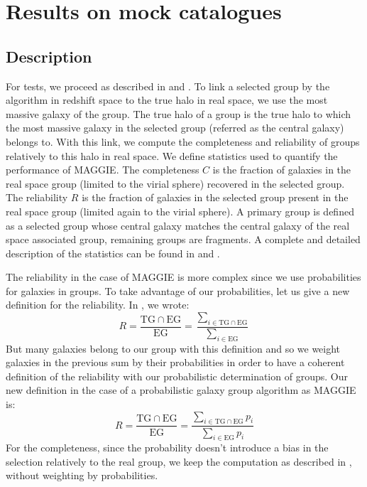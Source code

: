 \section{Results on mock catalogues}
\label{sec:results_on_mock_catalogue}

\subsection{Description}
\label{sub:maggie_tests_description}

For tests, we proceed as described in \citet{Yang+07, Duarte+14} and
. To link a selected group by the
algorithm in redshift space to the true halo in real space, we use the most
massive galaxy of the group. The true halo of a group is the true halo to which
the most massive galaxy in the selected group (referred as the central galaxy)
belongs to. With this link, we compute the completeness and reliability of
groups relatively to this halo in real space. We define statistics used to
quantify the performance of MAGGIE\@. The completeness $C$ is the fraction of
galaxies in the real space group (limited to the virial sphere) recovered in
the selected group. The reliability $R$ is the fraction of galaxies in the
selected group present in the real space group (limited again to the virial
sphere). A primary group is defined as a selected group whose central galaxy
matches the central galaxy of the real space associated group, remaining groups
are fragments. A complete and detailed description of the statistics can be
found in \citet{Duarte+14} and .

The reliability in the case of MAGGIE is more complex since we use
probabilities for galaxies in groups. To take advantage of our probabilities,
let us give a new definition for the reliability. In \citet{Duarte+14}, we
wrote:
%
\begin{equation}
    R=\frac{\mathrm{TG} \cap \mathrm{EG}}{\mathrm{EG}}=
    \frac{\sum_{i\in \mathrm{TG}\cap \mathrm{EG}}}{\sum_{i\in \mathrm{EG}}}
\end{equation}
%
But many galaxies belong to our group with this definition and so we
weight galaxies in the previous sum by their probabilities in order to have
a coherent definition of the reliability with our probabilistic
determination of groups. Our new definition in the case of a probabilistic
galaxy group algorithm as MAGGIE is:
%
\begin{equation}
    R=\frac{\mathrm{TG} \cap \mathrm{EG}}{\mathrm{EG}}=
    \frac{\sum_{i\in \mathrm{TG}\cap \mathrm{EG}} p_i}
    {\sum_{i\in \mathrm{EG}}p_i}
\end{equation}
%
For the completeness, since the probability doesn't introduce a bias in the
selection relatively to the real group, we keep the computation as described
in \citet{Duarte+14}, without weighting by probabilities.

